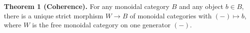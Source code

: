 \textbf{Theorem 1 (Coherence).} For any monoidal category $B$ and any object $b \in B$, there is a unique strict morphism $W \rightarrow B$ of monoidal categories with $(-) \mapsto b$, where $W$ is the free monoidal category on one generator $(-)$.

